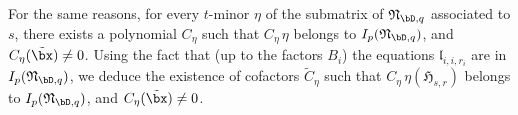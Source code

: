 \documentclass[12pt]{article}
\begin{document}
For the same reasons, for every $t$-minor $\eta$ of the submatrix of
$\mathfrak{N}_{\bD,q}$ associated to $s$, there exists a polynomial
$C_\eta$ such that $C_\eta\, \eta$ belongs to
$I_p(\mathfrak{N}_{\bD,q})$, and $C_\eta(\tilde\bx)\ne 0$. 
Using the
fact that (up to the factors $B_i$) the equations
$\mathfrak{l}_{i,i,r_i}$ are in $I_p(\mathfrak{N}_{\bD,q})$, we deduce
the existence of cofactors $\tilde C_\eta$ such that $C_\eta\, \eta(\mathfrak{H}_{s,r})$
belongs to $I_p(\mathfrak{N}_{\bD,q})$, and $C_\eta(\tilde\bx)\ne 0$.
\end{document}

